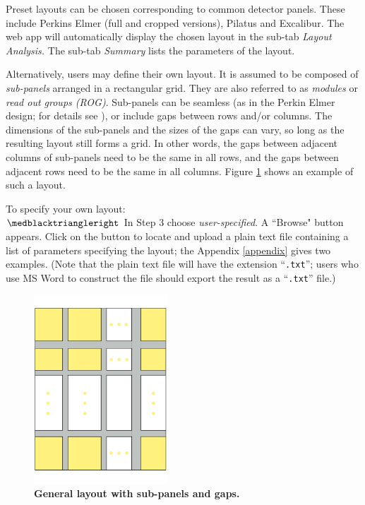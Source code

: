 \documentclass[11pt,a4paper]{article}
\begin{document}
Preset layouts can be chosen corresponding to common detector panels. These include Perkins Elmer (full and cropped versions), Pilatus and Excalibur. The web app will automatically display the chosen layout in the sub-tab \emph{Layout Analysis.} The sub-tab \emph{Summary} lists the parameters of the layout.

Alternatively, users may define their own layout.
It is assumed to be composed of \emph{sub-panels} arranged in a rectangular grid. They are also referred to as \emph{modules} or \emph{read out groups (ROG)}.
Sub-panels can be seamless (as in the Perkin Elmer design; for details see \cite{manualXRD1621}), or include gaps between rows
and/or columns. The dimensions of the sub-panels and the sizes of the gaps can vary, so long as the resulting layout still forms a grid. In other words, the gaps between adjacent columns of sub-panels need to be the same in all rows, and the gaps between adjacent rows need to be the same in all columns. Figure \ref{fig_layout_nopar} shows an example of such a layout.
 
To specify your own layout:
\\
$\medblacktriangleright$ In Step 3 choose \emph{user-specified}. 
A ``Browse" button appears. Click on the button
to locate and upload a plain
text file containing a list of parameters specifying the layout; the Appendix \ref{appendix} gives two examples. (Note that the plain text file will have the extension ``\texttt{.txt}''; users who use MS Word to construct the file should export the result as a ``\texttt{.txt}'' file.)

\begin{figure}[htbp]
\begin{center}
\includegraphics[width=5cm]{layoutDrawingNoPar.pdf}
\caption
{
{\bfseries 
General layout with sub-panels and gaps.}
}
\label{fig_layout_nopar}
\end{center}
\end{figure}
\end{document}
